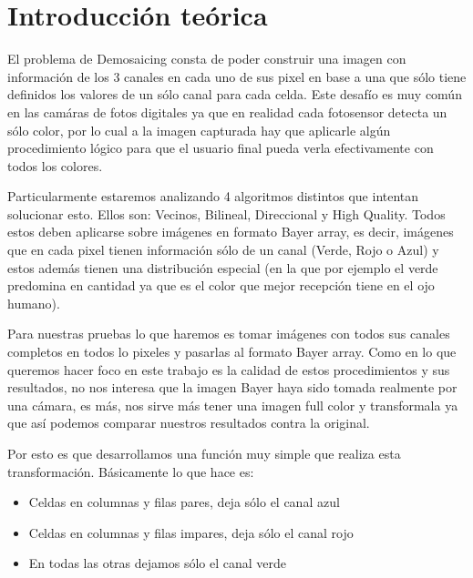 \section{Introducci\'on te\'orica}

El problema de Demosaicing consta de poder construir una imagen con información de los 3 canales en cada uno de sus pixel en base a una que sólo tiene definidos los valores de un sólo canal para cada celda. Este desafío es muy común en las camáras de fotos digitales ya que en realidad cada fotosensor detecta un sólo color, por lo cual a la imagen capturada hay que aplicarle algún procedimiento lógico para que el usuario final pueda verla efectivamente con todos los colores.

Particularmente estaremos analizando 4 algoritmos distintos que intentan solucionar esto. Ellos son: Vecinos, Bilineal, Direccional y High Quality. Todos estos deben aplicarse sobre imágenes en formato Bayer array, es decir, imágenes que en cada pixel tienen información sólo de un canal (Verde, Rojo o Azul) y estos además tienen una distribución especial (en la que por ejemplo el verde predomina en cantidad ya que es el color que mejor recepción tiene en el ojo humano).

Para nuestras pruebas lo que haremos es tomar imágenes con todos sus canales completos en todos lo pixeles y pasarlas al formato Bayer array. Como en lo que queremos hacer foco en este trabajo es la calidad de estos procedimientos y sus resultados, no nos interesa que la imagen Bayer haya sido tomada realmente por una cámara, es más, nos sirve más tener una imagen full color y transformala ya que así podemos comparar nuestros resultados contra la original.

Por esto es que desarrollamos una función muy simple que realiza esta transformación. Básicamente lo que hace es: 
\begin{itemize}
\item Celdas en columnas y filas pares, deja sólo el canal azul

\item Celdas en columnas y filas impares, deja sólo el canal rojo

\item En todas las otras dejamos sólo el canal verde
\end{itemize}   

